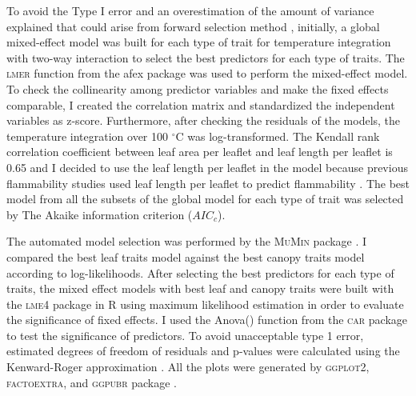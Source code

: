 \documentclass{ttuthes2007}
\newcommand{\pkg}[1]{\textsc{#1}}
\begin{document}
To avoid the  Type I error and an overestimation of the amount of variance explained that could arise from forward selection method \citep{blanchet2008forward}, initially, a global mixed-effect model was built for each type of trait for temperature integration with two-way interaction to select the best predictors for each type of traits.
The \pkg{lmer} function from the afex package \citep{singmann2015packageafex,afexluke2017evaluating} was used to perform the mixed-effect model.
To check the collinearity among predictor variables and make the fixed effects comparable, I created the correlation matrix and standardized the independent variables as z-score. Furthermore, after checking the residuals of the models, the temperature integration over 100 $^{\circ}$C was log-transformed. 
The Kendall rank correlation coefficient between leaf area per leaflet and leaf length per leaflet is 0.65 and I decided to use the leaf length per leaflet in the model because previous flammability studies used leaf length per leaflet to predict flammability \citep{alam2020shoot}. 
The best model from all the subsets of the global model for each type of trait was selected by The Akaike information criterion ($AIC_{c}$).

The automated model selection was performed by the \pkg{MuMin} package \citep{barton2015packagemumin}. I compared the best leaf traits model against the best canopy traits model according to log-likelihoods. After selecting the best predictors for each type of traits, the mixed effect models with best leaf and canopy traits were built with the \pkg{lme4} package in R \citep{bates2009package} using maximum likelihood estimation in order to evaluate the significance of fixed effects. I used the Anova() function from the \pkg{car} package \citep{fox2013hypothesis} to test the significance of predictors. To avoid unacceptable type 1 error, estimated degrees of freedom of residuals and p-values were calculated using the Kenward-Roger approximation \citep{kenward1997small}. All the plots were generated by \pkg{ggplot2}, \pkg{factoextra}, and \pkg{ggpubr} package \citep{wickham2016packageggplot2, kassambara2017packagefactoextra,kassambara2020package}.
\end{document}
